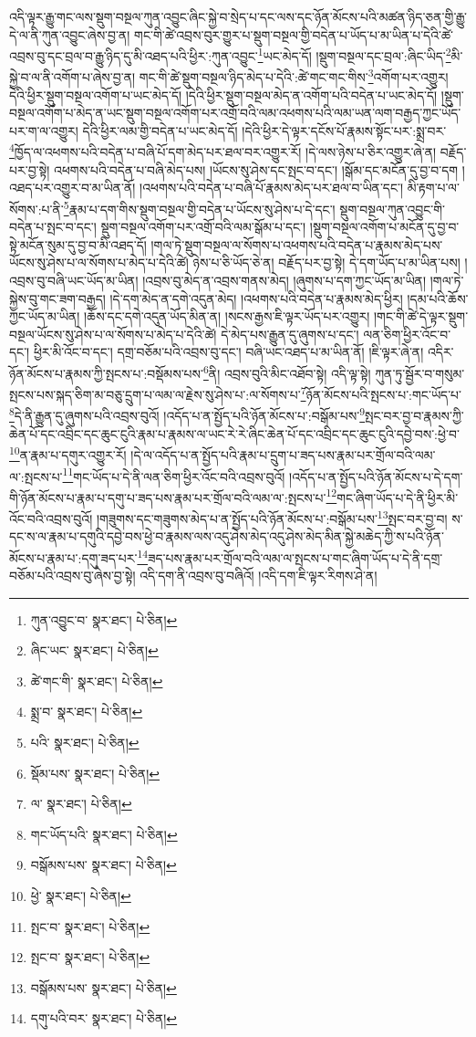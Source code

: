 འདི་ལྟར་རྒྱུ་གང་ལས་སྡུག་བསྔལ་ཀུན་འབྱུང་ཞིང་སྐྱེ་བ་སྲེད་པ་དང་ལས་དང་ཉོན་མོངས་པའི་མཚན་ཉིད་ཅན་གྱི་རྒྱུ་དེ་ལ་ནི་ཀུན་འབྱུང་ཞེས་བྱ་ན། གང་གི་ཚེ་འབྲས་བུར་གྱུར་པ་སྡུག་བསྔལ་གྱི་བདེན་པ་ཡོད་པ་མ་ཡིན་པ་དེའི་ཚེ་འབྲས་བུ་དང་བྲལ་བ་རྒྱུ་ཉིད་དུ་མི་འཐད་པའི་ཕྱིར་:ཀུན་འབྱུང་\footnote{ཀུན་འབྱུང་བ་  སྣར་ཐང་།  པེ་ཅིན། }ཡང་མེད་དོ། །སྡུག་བསྔལ་དང་བྲལ་:ཞིང་ཡིད་\footnote{ཞིང་ཡང་  སྣར་ཐང་།  པེ་ཅིན། }མི་སྐྱེ་བ་ལ་ནི་འགོག་པ་ཞེས་བྱ་ན། གང་གི་ཚེ་སྡུག་བསྔལ་ཉིད་མེད་པ་དེའི་:ཚེ་གང་གང་གིས་\footnote{ཚེ་གང་གི་  སྣར་ཐང་།  པེ་ཅིན། }འགོག་པར་འགྱུར། དེའི་ཕྱིར་སྡུག་བསྔལ་འགོག་པ་ཡང་མེད་དོ། །དེའི་ཕྱིར་སྡུག་བསྔལ་མེད་ན་འགོག་པའི་བདེན་པ་ཡང་མེད་དོ། །སྡུག་བསྔལ་འགོག་པ་མེད་ན་ཡང་སྡུག་བསྔལ་འགོག་པར་འགྲོ་བའི་ལམ་འཕགས་པའི་ལམ་ཡན་ལག་བརྒྱད་ཀྱང་ཡོད་པར་ག་ལ་འགྱུར། དེའི་ཕྱིར་ལམ་གྱི་བདེན་པ་ཡང་མེད་དོ། །དེའི་ཕྱིར་དེ་ལྟར་དངོས་པོ་རྣམས་སྟོང་པར་:སྨྲ་བར་\footnote{སྨྲ་བ་  སྣར་ཐང་།  པེ་ཅིན། }ཁྱོད་ལ་འཕགས་པའི་བདེན་པ་བཞི་པོ་དག་མེད་པར་ཐལ་བར་འགྱུར་རོ། །དེ་ལས་ཉེས་པ་ཅིར་འགྱུར་ཞེ་ན། བརྗོད་པར་བྱ་སྟེ། འཕགས་པའི་བདེན་པ་བཞི་མེད་པས། །ཡོངས་སུ་ཤེས་དང་སྤང་བ་དང་། །སྒོམ་དང་མངོན་དུ་བྱ་བ་དག །འཐད་པར་འགྱུར་བ་མ་ཡིན་ནོ། །འཕགས་པའི་བདེན་པ་བཞི་པོ་རྣམས་མེད་པར་ཐལ་བ་ཡིན་དང་། མི་རྟག་པ་ལ་སོགས་:པ་ནི་\footnote{པའི་  སྣར་ཐང་།  པེ་ཅིན། }རྣམ་པ་དག་གིས་སྡུག་བསྔལ་གྱི་བདེན་པ་ཡོངས་སུ་ཤེས་པ་དེ་དང་། སྡུག་བསྔལ་ཀུན་འབྱུང་གི་བདེན་པ་སྤང་བ་དང་། སྡུག་བསྔལ་འགོག་པར་འགྲོ་བའི་ལམ་སྒོམ་པ་དང་། །སྡུག་བསྔལ་འགོག་པ་མངོན་དུ་བྱ་བ་སྟེ་མངོན་སུམ་དུ་བྱ་བ་མི་འཐད་དོ། །གལ་ཏེ་སྡུག་བསྔལ་ལ་སོགས་པ་འཕགས་པའི་བདེན་པ་རྣམས་མེད་པས་ཡོངས་སུ་ཤེས་པ་ལ་སོགས་པ་མེད་པ་དེའི་ཚེ། ཉེས་པ་ཅི་ཡོད་ཅེ་ན། བརྗོད་པར་བྱ་སྟེ། དེ་དག་ཡོད་པ་མ་ཡིན་པས། །འབྲས་བུ་བཞི་ཡང་ཡོད་མ་ཡིན། །འབྲས་བུ་མེད་ན་འབྲས་གནས་མེད། །ཞུགས་པ་དག་ཀྱང་ཡོད་མ་ཡིན། །གལ་ཏེ་སྐྱེས་བུ་གང་ཟག་བརྒྱད། །དེ་དག་མེད་ན་དགེ་འདུན་མེད། །འཕགས་པའི་བདེན་པ་རྣམས་མེད་ཕྱིར། །དམ་པའི་ཆོས་ཀྱང་ཡོད་མ་ཡིན། །ཆོས་དང་དགེ་འདུན་ཡོད་མིན་ན། །སངས་རྒྱས་ཇི་ལྟར་ཡོད་པར་འགྱུར། །གང་གི་ཚེ་དེ་ལྟར་སྡུག་བསྔལ་ཡོངས་སུ་ཤེས་པ་ལ་སོགས་པ་མེད་པ་དེའི་ཚེ། དེ་མེད་པས་རྒྱུན་དུ་ཞུགས་པ་དང་། ལན་ཅིག་ཕྱིར་འོང་བ་དང་། ཕྱིར་མི་འོང་བ་དང་། དགྲ་བཅོམ་པའི་འབྲས་བུ་དང་། བཞི་ཡང་འཐད་པ་མ་ཡིན་ནོ། །ཇི་ལྟར་ཞེ་ན། འདིར་ཉོན་མོངས་པ་རྣམས་ཀྱི་སྤངས་པ་:བསྡོམས་པས་\footnote{སྡོམ་པས་  སྣར་ཐང་།  པེ་ཅིན། }ནི། འབྲས་བུའི་མིང་འཐོབ་སྟེ། འདི་ལྟ་སྟེ། ཀུན་ཏུ་སྦྱོར་བ་གསུམ་སྤངས་པས་སྐད་ཅིག་མ་བཅུ་དྲུག་པ་ལམ་ལ་རྗེས་སུ་ཤེས་པ་:ལ་སོགས་པ་\footnote{ལ་  སྣར་ཐང་།  པེ་ཅིན། }ཉོན་མོངས་པའི་སྤངས་པ་:གང་ཡོད་པ་\footnote{གང་ཡོད་པའི་  སྣར་ཐང་།  པེ་ཅིན། }དེ་ནི་རྒྱུན་དུ་ཞུགས་པའི་འབྲས་བུའོ། །འདོད་པ་ན་སྤྱོད་པའི་ཉོན་མོངས་པ་:བསྒོམ་པས་\footnote{བསྒོམས་པས་  སྣར་ཐང་།  པེ་ཅིན། }སྤང་བར་བྱ་བ་རྣམས་ཀྱི་ཆེན་པོ་དང་འབྲིང་དང་ཆུང་ངུའི་རྣམ་པ་རྣམས་ལ་ཡང་རེ་རེ་ཞིང་ཆེན་པོ་དང་འབྲིང་དང་ཆུང་ངུའི་དབྱེ་བས་:ཕྱེ་བ་\footnote{ཕྱེ་  སྣར་ཐང་།  པེ་ཅིན། }ན་རྣམ་པ་དགུར་འགྱུར་རོ། །དེ་ལ་འདོད་པ་ན་སྤྱོད་པའི་རྣམ་པ་དྲུག་པ་ཟད་པས་རྣམ་པར་གྲོལ་བའི་ལམ་ལ་:སྤངས་པ་\footnote{སྤང་བ་  སྣར་ཐང་།  པེ་ཅིན། }གང་ཡོད་པ་དེ་ནི་ལན་ཅིག་ཕྱིར་འོང་བའི་འབྲས་བུའོ། །འདོད་པ་ན་སྤྱོད་པའི་ཉོན་མོངས་པ་དེ་དག་གི་ཉོན་མོངས་པ་རྣམ་པ་དགུ་པ་ཟད་པས་རྣམ་པར་གྲོལ་བའི་ལམ་ལ་:སྤངས་པ་\footnote{སྤང་བ་  སྣར་ཐང་།  པེ་ཅིན། }གང་ཞིག་ཡོད་པ་དེ་ནི་ཕྱིར་མི་འོང་བའི་འབྲས་བུའོ། །གཟུགས་དང་གཟུགས་མེད་པ་ན་སྤྱོད་པའི་ཉོན་མོངས་པ་:བསྒོམ་པས་\footnote{བསྒོམས་པས་  སྣར་ཐང་།  པེ་ཅིན། }སྤང་བར་བྱ་བ། ས་དང་ས་ལ་རྣམ་པ་དགུའི་དབྱེ་བས་ཕྱེ་བ་རྣམས་ལས་འདུ་ཤེས་མེད་འདུ་ཤེས་མེད་མིན་སྐྱེ་མཆེད་ཀྱི་ས་པའི་ཉོན་མོངས་པ་རྣམ་པ་:དགུ་ཟད་པར་\footnote{དགུ་པའི་བར་  སྣར་ཐང་།  པེ་ཅིན། }ཟད་པས་རྣམ་པར་གྲོལ་བའི་ལམ་ལ་སྤངས་པ་གང་ཞིག་ཡོད་པ་དེ་ནི་དགྲ་བཅོམ་པའི་འབྲས་བུ་ཞེས་བྱ་སྟེ། འདི་དག་ནི་འབྲས་བུ་བཞིའོ། །འདི་དག་ཇི་ལྟར་རིགས་ཤེ་ན། 